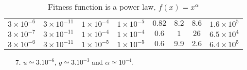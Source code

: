 \documentclass[10pt]{beamer}
\begin{document}
\begin{frame}
\begin{table}[ht]
\begin{adjustbox}{width = 1\textwidth}
\begin{tabular}{|c|c|c|c|c|c|c|c|}
					$3 \times 10^{-6}$ & $3 \times 10^{-11}$ & $1 \times 10^{-4}$ & $1 \times 10^{-5}$ & $0.82$ & $8.2$ & $8.6$ & $1.6 \times 10^{5}$\\
					$3 \times 10^{-7}$ & $3 \times 10^{-11}$ & $1 \times 10^{-4}$ & $1 \times 10^{-4}$ & $0.6$ & $1$ & $26$ & $6.5 \times 10^{4}$\\
					$3 \times 10^{-6}$ & $3 \times 10^{-11}$ & $1 \times 10^{-5}$ & $1 \times 10^{-5}$ & $0.6$ & $9.9$ & $2.6$ & $6.4 \times 10^{5}$\\
					\hline
				\end{tabular}
			\end{adjustbox}
			\caption{Fitness function is a power law, $f(x)=x^{\alpha}$}
		\end{table}
		\vspace{-10pt}
		\begin{enumerate}
			\item[7.] $u \simeq 3.10^{-6}$, $g \simeq 3.10^{-3}$ and $\alpha \simeq 10^{-4}$.
		\end{enumerate}
	\end{frame}
\end{document}
